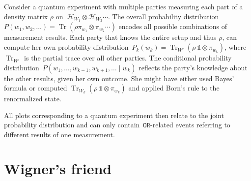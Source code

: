 \documentclass[aps,pra,twocolumn]{revtex4-1}
\renewcommand{\H}{\mathcal{H}}
\newcommand{\OR}{\mathtt{OR}}
\newcommand{\id}{\mathds{1}}
\DeclareMathOperator{\tr}{Tr}
\theoremstyle{definition}
\theoremstyle{remark}
\begin{document}
Consider a quantum experiment with multiple parties measuring each part of a density matrix $\rho$ on~$\H_{W_1}\otimes \H_{W_2} \cdots$. The overall probability distribution~$P(w_1,w_2,\ldots)=\tr(\rho \pi_{w_1}\otimes \pi_{w_2} \cdots) $ encodes all possible combinations of measurement results.
Each party that knows the entire setup and thus $\rho$, can compute her own probability distribution~$P_k(w_k)= \tr_{W'}(\rho \ \id\otimes \pi_{w_k})$, where $\tr_{W'}$ is the partial trace over all other parties. The conditional probability distribution~$P(w_1,\ldots, w_{k-1}, w_{k+1}, \ldots \mid w_k)$ reflects the party's knowledge about the other results, given her own outcome. She might have either used Bayes' formula or computed $\tr_{W_k}( \rho \ \id\otimes \pi_{w_k})$ and applied Born's rule to the renormalized state. 

All plots corresponding to a quantum experiment then relate to the joint probability distribution and can only contain~$\OR$-related events referring to different results of one measurement.
 \section{Wigner's friend}
\label{sec:Wigner}
\end{document}
